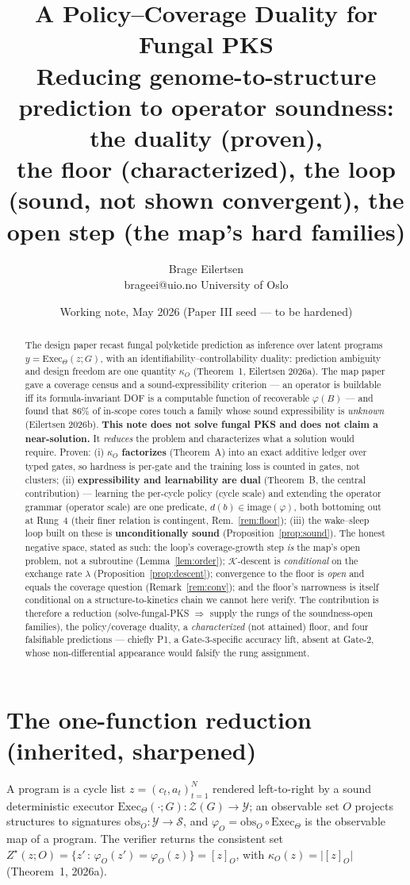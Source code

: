 \documentclass[11pt]{article}
\title{\textbf{A Policy--Coverage Duality for Fungal PKS}\\[2pt]
\large Reducing genome-to-structure prediction to operator soundness: the duality (proven),\\ the floor (characterized), the loop (sound, not shown convergent), the open step (the map's hard families)}
\author{Brage Eilertsen\\ \small brageei@uio.no \quad University of Oslo}
\date{Working note, May 2026 \quad\small(Paper III seed --- to be hardened)}
\theoremstyle{plain}
\theoremstyle{definition}
\newcommand{\Exec}{\mathrm{Exec}}
\newcommand{\obs}{\mathrm{obs}}
\newcommand{\Zstar}{Z^{\star}}
\newcommand{\kO}{\kappa_{O}}
\newcommand{\Y}{\mathcal{Y}}
\newcommand{\Sig}{\mathcal{S}}
\begin{document}
\maketitle

\begin{abstract}
The design paper recast fungal polyketide prediction as inference over latent programs $y=\Exec_\Theta(z;G)$, with an identifiability--controllability duality: prediction ambiguity and design freedom are one quantity $\kO$ (Theorem~1, Eilertsen 2026a). The map paper gave a coverage census and a sound-expressibility criterion --- an operator is buildable iff its formula-invariant DOF is a computable function of recoverable $\varphi(B)$ --- and found that $86\%$ of in-scope cores touch a family whose sound expressibility is \emph{unknown} (Eilertsen 2026b). \textbf{This note does not solve fungal PKS and does not claim a near-solution.} It \emph{reduces} the problem and characterizes what a solution would require. Proven: (i) \textbf{$\kO$ factorizes} (Theorem~A) into an exact additive ledger over typed gates, so hardness is per-gate and the training loss is counted in gates, not clusters; (ii) \textbf{expressibility and learnability are dual} (Theorem~B, the central contribution) --- learning the per-cycle policy (cycle scale) and extending the operator grammar (operator scale) are one predicate, $d(b)\in\mathrm{image}(\varphi)$, both bottoming out at Rung~4 (their finer relation is contingent, Rem.~\ref{rem:floor}); (iii) the wake--sleep loop built on these is \textbf{unconditionally sound} (Proposition~\ref{prop:sound}). The honest negative space, stated as such: the loop's coverage-growth step \emph{is} the map's open problem, not a subroutine (Lemma~\ref{lem:order}); $\mathcal{K}$-descent is \emph{conditional} on the exchange rate $\lambda$ (Proposition~\ref{prop:descent}); convergence to the floor is \emph{open} and equals the coverage question (Remark~\ref{rem:conv}); and the floor's narrowness is itself conditional on a structure-to-kinetics chain we cannot here verify. The contribution is therefore a reduction (solve-fungal-PKS $\Rightarrow$ supply the rungs of the soundness-open families), the policy/coverage duality, a \emph{characterized} (not attained) floor, and four falsifiable predictions --- chiefly P1, a Gate-3-specific accuracy lift, absent at Gate-2, whose non-differential appearance would falsify the rung assignment.
\end{abstract}

\section{The one-function reduction (inherited, sharpened)}
A program is a cycle list $z=(c_t,a_t)_{t=1}^N$ rendered left-to-right by a sound deterministic executor $\Exec_\Theta(\cdot;G):\mathcal{Z}(G)\to\Y$; an observable set $O$ projects structures to signatures $\obs_O:\Y\to\Sig$, and $\varphi_O=\obs_O\circ\Exec_\Theta$ is the observable map of a program. The verifier returns the consistent set $\Zstar(z;O)=\{z'\,:\,\varphi_O(z')=\varphi_O(z)\}=[z]_O$, with $\kO(z)=\lvert[z]_O\rvert$ (Theorem~1, 2026a).
\end{document}
